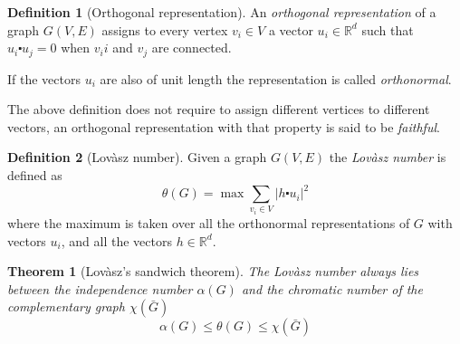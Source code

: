 \documentclass[a4paper]{article}
\newcommand{\abs}[1]{\lvert #1 \rvert}
\newcommand{\Real}{\mathbb{R}}
\newcommand{\sdot}{\centerdot}
\newtheorem{theorem}{Theorem}[section]
\theoremstyle{definition}
\newtheorem{definition}{Definition}[section]
\begin{document}
\begin{definition}[Orthogonal representation]
    An \emph{orthogonal representation} of a graph $G(V,E)$ assigns to every vertex
    $v_i\in V$ a vector $u_i \in \Real^d$ such that $u_i \sdot u_j = 0$ when
    $v_ii$ and $v_j$ are connected.
\end{definition}
If the vectors $u_i$ are also of unit length the representation is called
\emph{orthonormal}.

The above definition does not require to assign different vertices to different
vectors, an orthogonal representation with that property is said to be
\emph{faithful}.

\begin{definition}[Lovàsz number]
    Given a graph $G(V,E)$ the \emph{Lovàsz number} is defined as
    \begin{equation}
        \theta(G) = \max \sum_{v_i \in V} \abs{h \sdot u_i}^2
        \label{eq:Lovasz_theta}
    \end{equation}
    where the maximum is taken over all the orthonormal representations of
    $G$ with vectors $u_i$, and all the vectors $h \in \Real^d$.
\end{definition}
\begin{theorem}[Lovàsz's sandwich theorem]
    The Lovàsz number always lies between the independence number $\alpha(G)$
    and the chromatic number of the complementary graph $\chi(\bar G)$
    \begin{equation}
        \alpha(G) \le \theta(G) \le \chi(\bar G) 
        \label{eq:sandwich_theorem}
    \end{equation}
    \label{th:sandwich}
\end{theorem}

\end{document}
